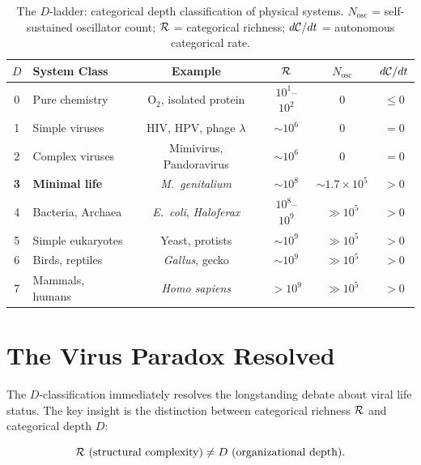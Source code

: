 \begin{table}[htbp]
\centering
\caption{The $D$-ladder: categorical depth classification of physical systems.
$N_{\mathrm{osc}}$ = self-sustained oscillator count; $\mathcal{R}$ = categorical
richness; $d\mathcal{C}/dt$ = autonomous categorical rate.}
\label{tab:d_ladder}
\begin{tabular}{clcccc}
\toprule
$D$ & System Class & Example & $\mathcal{R}$ & $N_{\mathrm{osc}}$ & $d\mathcal{C}/dt$ \\
\midrule
0 & Pure chemistry       & $\mathrm{O_2}$, isolated protein & $10^1$--$10^2$ & 0 & $\leq 0$ \\
1 & Simple viruses       & HIV, HPV, phage $\lambda$         & $\sim 10^6$    & 0 & $= 0$ \\
2 & Complex viruses      & Mimivirus, Pandoravirus           & $\sim 10^6$    & 0 & $= 0$ \\
\midrule
\textbf{3} & \textbf{Minimal life} & \textit{M.~genitalium} & $\sim 10^8$ & $\sim 1.7\times 10^5$ & $> 0$ \\
\midrule
4 & Bacteria, Archaea    & \textit{E.~coli}, \textit{Haloferax} & $10^8$--$10^9$ & $\gg 10^5$ & $> 0$ \\
5 & Simple eukaryotes    & Yeast, protists                   & $\sim 10^9$    & $\gg 10^5$ & $> 0$ \\
6 & Birds, reptiles      & \textit{Gallus}, gecko            & $\sim 10^9$    & $\gg 10^5$ & $> 0$ \\
7 & Mammals, humans      & \textit{Homo sapiens}             & $> 10^9$       & $\gg 10^5$ & $> 0$ \\
\bottomrule
\end{tabular}
\end{table}

\section{The Virus Paradox Resolved}
\label{sec:virus_paradox}

The $D$-classification immediately resolves the longstanding debate about viral
life status. The key insight is the distinction between categorical richness
$\mathcal{R}$ and categorical depth $D$:

\begin{equation}
  \mathcal{R} \text{ (structural complexity)} \neq D \text{ (organizational depth)}.
  \label{eq:richness_vs_depth}
\end{equation}

